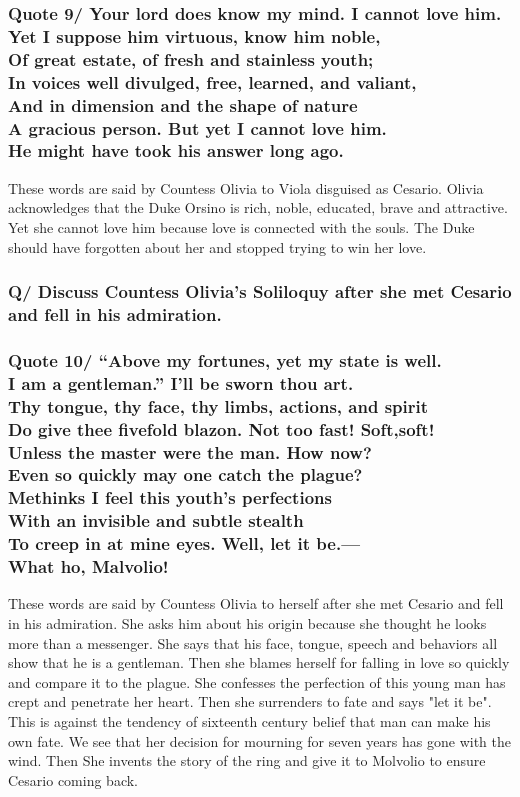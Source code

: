 \documentclass[12pt, a4paper]{article}
\begin{document}
\subsubsection*{Quote 9/
Your lord does know my mind. I cannot love him.\\
Yet I suppose him virtuous, know him noble,\\
Of great estate, of fresh and stainless youth;\\
In voices well divulged, free, learned, and valiant,\\
And in dimension and the shape of nature\\
A gracious person. But yet I cannot love him.\\
He might have took his answer long ago.
}

These words are said by Countess Olivia to Viola disguised as Cesario.
Olivia acknowledges that the Duke Orsino is rich, noble, educated, brave 
and attractive. Yet she cannot love him because love is connected with
the souls. The Duke should have forgotten about her and stopped trying 
to win her love.

\subsubsection*{Q/ Discuss Countess Olivia's Soliloquy after she met
Cesario and fell in his admiration.}

\subsubsection*{Quote 10/
“Above my fortunes, yet my state is well.\\
I am a gentleman.” I’ll be sworn thou art.\\
Thy tongue, thy face, thy limbs, actions, and spirit\\
Do give thee fivefold blazon. Not too fast! Soft,soft!\\
Unless the master were the man. How now?\\
Even so quickly may one catch the plague?\\
Methinks I feel this youth’s perfections\\
With an invisible and subtle stealth\\
To creep in at mine eyes. Well, let it be.—\\
What ho, Malvolio!
}

These words are said by Countess Olivia to herself after she met Cesario
and fell in his admiration. She asks him about his origin because she
thought he looks more than a messenger. She says that his face, tongue, 
speech and behaviors all show that he is a gentleman. Then she blames
herself for falling in love so quickly and compare it to the plague. 
She confesses the perfection of this young man has crept and penetrate
her heart. Then she surrenders to fate and says "let it be". This is
against the tendency of sixteenth century belief that man can make his own
fate. We see that her decision for mourning for seven years has gone
with the wind. Then She invents the story of the ring and give it to 
Molvolio to ensure Cesario coming back.\medbreak
\end{document}
